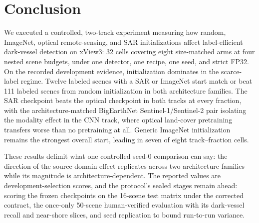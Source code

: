 \section{Conclusion}
\label{sec:conclusion}

We executed a controlled, two-track experiment measuring how random,
ImageNet, optical remote-sensing, and SAR initializations affect
label-efficient dark-vessel detection on xView3: 32 cells covering eight
size-matched arms at four nested scene budgets, under one detector, one
recipe, one seed, and strict FP32. On the recorded development evidence,
initialization dominates in the scarce-label regime. Twelve labeled scenes
with a SAR or ImageNet start match or beat 111 labeled scenes from random
initialization in both architecture families. The SAR checkpoint beats the
optical checkpoint in both tracks at every fraction, with the
architecture-matched BigEarthNet Sentinel-1/Sentinel-2 pair isolating the
modality effect in the CNN track, where optical land-cover pretraining
transfers worse than no pretraining at all. Generic ImageNet initialization
remains the strongest overall start, leading in seven of eight
track--fraction cells.

These results delimit what one controlled seed-0 comparison can say: the
direction of the source-domain effect replicates across two architecture
families while its magnitude is architecture-dependent. The reported values
are development-selection scores, and the protocol's sealed stages remain
ahead: scoring the frozen checkpoints on the 16-scene test matrix under the
corrected contract, the once-only 50-scene human-verified evaluation with
its dark-vessel recall and near-shore slices, and seed replication to bound
run-to-run variance.
